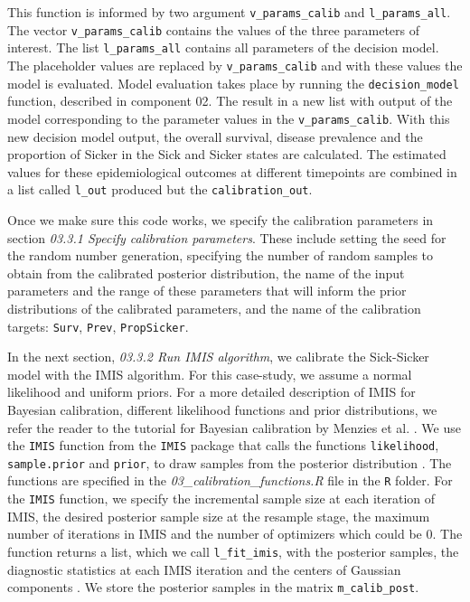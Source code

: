 \documentclass[
]{book}
\begin{document}
This function is informed by two argument \texttt{v\_params\_calib} and \texttt{l\_params\_all}. The vector \texttt{v\_params\_calib} contains the values of the three parameters of interest. The list \texttt{l\_params\_all} contains all parameters of the decision model. The placeholder values are replaced by \texttt{v\_params\_calib} and with these values the model is evaluated. Model evaluation takes place by running the \texttt{decision\_model} function, described in component 02. The result in a new list with output of the model corresponding to the parameter values in the \texttt{v\_params\_calib}. With this new decision model output, the overall survival, disease prevalence and the proportion of Sicker in the Sick and Sicker states are calculated. The estimated values for these epidemiological outcomes at different timepoints are combined in a list called \texttt{l\_out} produced but the \texttt{calibration\_out}.

Once we make sure this code works, we specify the calibration parameters in section \emph{03.3.1 Specify calibration parameters}. These include setting the seed for the random number generation, specifying the number of random samples to obtain from the calibrated posterior distribution, the name of the input parameters and the range of these parameters that will inform the prior distributions of the calibrated parameters, and the name of the calibration targets: \texttt{Surv}, \texttt{Prev}, \texttt{PropSicker}.

In the next section, \emph{03.3.2 Run IMIS algorithm}, we calibrate the Sick-Sicker model with the IMIS algorithm. For this case-study, we assume a normal likelihood and uniform priors. For a more detailed description of IMIS for Bayesian calibration, different likelihood functions and prior distributions, we refer the reader to the tutorial for Bayesian calibration by Menzies et al. \citep{Menzies2017}. We use the \texttt{IMIS} function from the \texttt{IMIS} package that calls the functions \texttt{likelihood}, \texttt{sample.prior} and \texttt{prior}, to draw samples from the posterior distribution \citep{IMIS}. The functions are specified in the \emph{03\_calibration\_functions.R} file in the \texttt{R} folder. For the \texttt{IMIS} function, we specify the incremental sample size at each iteration of IMIS, the desired posterior sample size at the resample stage, the maximum number of iterations in IMIS and the number of optimizers which could be 0. The function returns a list, which we call \texttt{l\_fit\_imis}, with the posterior samples, the diagnostic statistics at each IMIS iteration and the centers of Gaussian components \citep{IMIS}. We store the posterior samples in the matrix \texttt{m\_calib\_post}.
\end{document}
